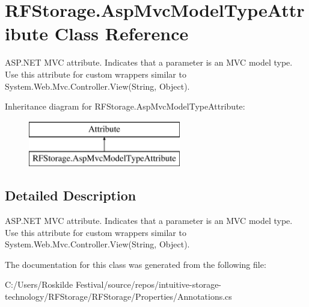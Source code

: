 \section{R\+F\+Storage.\+Asp\+Mvc\+Model\+Type\+Attribute Class Reference}
\label{class_r_f_storage_1_1_asp_mvc_model_type_attribute}


A\+S\+P.\+N\+ET M\+VC attribute. Indicates that a parameter is an M\+VC model type. Use this attribute for custom wrappers similar to {\ttfamily System.\+Web.\+Mvc.\+Controller.\+View(\+String, Object)}.  


Inheritance diagram for R\+F\+Storage.\+Asp\+Mvc\+Model\+Type\+Attribute\+:\begin{figure}[H]
\begin{center}
\leavevmode
\includegraphics[height=2.000000cm]{class_r_f_storage_1_1_asp_mvc_model_type_attribute}
\end{center}
\end{figure}


\subsection{Detailed Description}
A\+S\+P.\+N\+ET M\+VC attribute. Indicates that a parameter is an M\+VC model type. Use this attribute for custom wrappers similar to {\ttfamily System.\+Web.\+Mvc.\+Controller.\+View(\+String, Object)}. 



The documentation for this class was generated from the following file\+:\begin{DoxyCompactItemize}
\item 
C\+:/\+Users/\+Roskilde Festival/source/repos/intuitive-\/storage-\/technology/\+R\+F\+Storage/\+R\+F\+Storage/\+Properties/Annotations.\+cs\end{DoxyCompactItemize}
